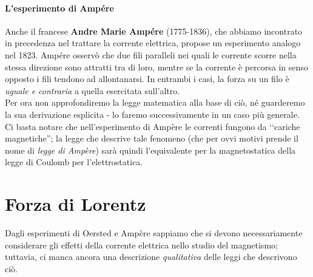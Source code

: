 \paragraph{L'esperimento di Ampére}
Anche il francese \textbf{Andre Marie Ampére} (1775-1836), che abbiamo incontrato in precedenza nel trattare la corrente elettrica, propose un esperimento analogo nel 1823. %
Ampére osservò che due fili paralleli nei quali le corrente scorre nella stessa direzione sono attratti tra di loro, mentre se la corrente è percorsa in senso opposto i fili tendono ad allontanarsi.
In entrambi i casi, la forza su un filo è \textit{uguale e contraria} a quella esercitata sull'altro.\\
Per ora non approfondiremo la legge matematica alla base di ciò, né guarderemo la sua derivazione esplicita - lo faremo successivamente in un caso più generale. Ci basta notare che nell'esperimento di Ampère le correnti fungono da ‘‘cariche magnetiche''; la legge che descrive tale fenomeno (che per ovvi motivi prende il nome di \textit{legge di Ampère}) sarà quindi l'equivalente per la magnetostatica della legge di Coulomb per l'elettrostatica.
\section{Forza di Lorentz}
Dagli esperimenti di Oersted e Ampère sappiamo che si devono necessariamente considerare gli effetti della corrente elettrica nello studio del magnetismo; tuttavia, ci manca ancora una descrizione \textit{qualitativa} delle leggi che descrivono ciò.

